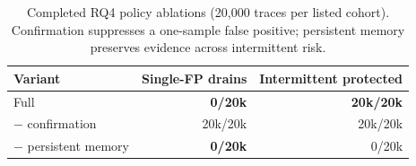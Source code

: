 \begin{table}[t]
  \centering
  \scriptsize
  \caption{Completed RQ4 policy ablations (20,000 traces per listed cohort). Confirmation suppresses a one-sample false positive; persistent memory preserves evidence across intermittent risk.}
  \label{tab:rq4-results}
  \begin{tabular}{@{}lrr@{}}
    \toprule
    Variant & Single-FP drains & Intermittent protected \\
    \midrule
    Full & \textbf{0/20k} & \textbf{20k/20k} \\
    $-$ confirmation & 20k/20k & 20k/20k \\
    $-$ persistent memory & \textbf{0/20k} & 0/20k \\
    \bottomrule
  \end{tabular}
\end{table}
